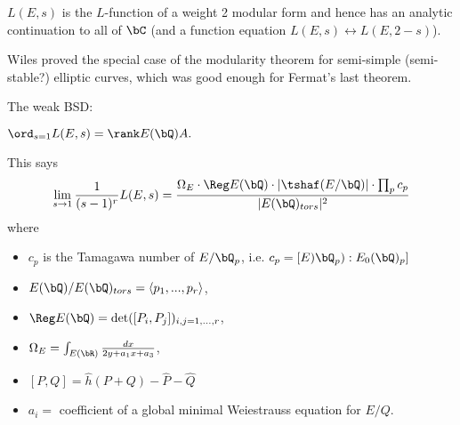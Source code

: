 \begin{thm}\label{thm:modularity-theorem}
	$L(E,s)$ is the $L$-function of a weight 2 modular form and hence has an analytic continuation to all of $\bC$ (and a function equation $L(E,s) \leftrightarrow L(E,2 - s)$).
\end{thm}
Wiles proved the special case of the modularity theorem for semi-simple (semi-stable?) elliptic curves, which was good enough for Fermat's last theorem.

The weak BSD:
\begin{conj}\label{conj:weak-BSD}
	$\ord_{s=1}L(E,s) = \rank E(\bQ)A.$
\end{conj}
\begin{conj}\label{conj:strong-BSD}
	This says 
	\begin{align*}
		\lim_{s\to 1} \frac{1}{(s - 1)^r} L(E,s) = \frac{\Omega_E \cdot \Reg E(\bQ) \cdot |\tshaf(E/\bQ)|\cdot \prod_p c_p}{|E(\bQ)_{tors}|^2}
	\end{align*}
	where 
	\begin{itemize}
		\item $c_p$ is the Tamagawa number of $E/\bQ_p$, i.e. $c_p = [E)\bQ_p) : E_0(\bQ)_p]$
		\item $E(\bQ)/E(\bQ)_{tors} = \langle p_1,...,p_r \rangle$,
		\item $\Reg E(\bQ) = \det([P_i, P_j])_{i,j = 1,...,r}$, 
		\item $\Omega_E = \int_{E(\bR)} \frac{dx}{2y + a_1x + a_3}$,
		\item $[P,Q] = \hat{h}(P+Q) - \hat{P} - \hat{Q}$ 
		\item $a_i = $ coefficient of a global minimal Weiestrauss equation for $E/Q$.
	\end{itemize}
\end{conj}

